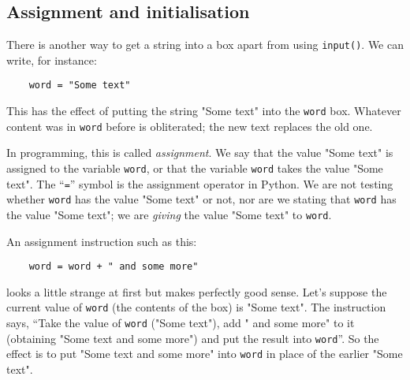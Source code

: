 
\subsection{Assignment and initialisation}

There is another way to get a string into a box apart from using
\verb!input()!.  We can write, for instance:

\begin{Verbatim}
    word = "Some text"
\end{Verbatim}

This has the effect of putting the string "Some text" into the
\verb!word! box.  Whatever content was in \verb!word! before is obliterated; the
new text replaces the old one. 

In programming, this is called \emph{assignment}.  We say that the
value "Some text" is
assigned to the variable \verb!word!, or that the variable \verb!word! takes the
value "Some text".  The ``\texttt{=}'' symbol is the assignment operator in Python.  We are not
testing whether \verb!word! has the value "Some text" or not, nor are we stating that
\verb!word! has the value "Some text"; we are \emph{giving} the value
"Some text" to \verb!word!.

%

An assignment instruction such as this:

\begin{Verbatim}
    word = word + " and some more"
\end{Verbatim}

looks a little strange at first but makes perfectly good sense.
Let's suppose the current value of \verb!word! (the contents of the
box) is "Some text".
The instruction says, ``Take the value of \verb!word!
("Some text"), add " and some more"  to it (obtaining "Some text and some
more") 
and put the result into \verb!word!''.
So the effect is to put "Some text and some more" into \verb!word! in
place of the earlier "Some text".




